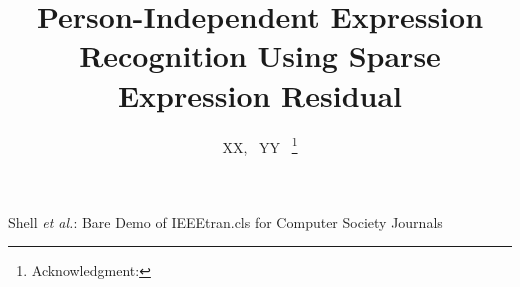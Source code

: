 \documentclass[journal]{IEEEtran}
\begin{document}
%
\title{Person-Independent Expression Recognition Using Sparse Expression Residual}
%
%
%

\author{XX,~
				YY~%
\thanks{\IEEEcompsocthanksitem Acknowledgment: \IEEEcompsocthanksitem 

}}


%
{Shell \MakeLowercase{\textit{et al.}}: Bare Demo of
IEEEtran.cls for Computer Society Journals}
\maketitle
\end{document}
